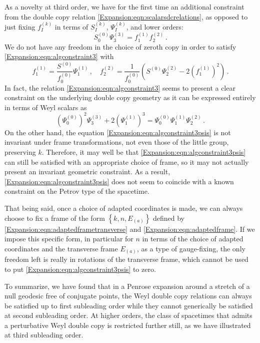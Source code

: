 As a novelty at third order, we have for the first time an additional constraint from the double copy relation \eqref{Expansion:eqn:scalarsdcrelations}, as opposed to just fixing $f^{(k)}_I$ in terms of $S^{(k)}_I$, $\Psi^{(k)}_I$, and lower orders:
\begin{equation}\label{Expansion:eqn:algconstraint3}
S^{(0)}_0 \Psi_3^{(3)} = f^{(1)}_1 f^{(2)}_2 \, .
\end{equation}
We do not have any freedom in the choice of zeroth copy in order to satisfy \eqref{Expansion:eqn:algconstraint3} with 
\begin{equation}
f^{(1)}_1 = \frac{S^{(0)}}{f_0^{(0)}} \Psi_1^{(1)}  \, , \quad  f^{(2)}_2 = \frac{1}{f_0^{(0)}}\left(S^{(0)}\Psi_2^{(2)}-2 (f_1^{(1)})^2\right) \, .
\end{equation}
In fact, the relation \eqref{Expansion:eqn:algconstraint3} seems to present a clear constraint on the underlying double copy geometry as it can be expressed entirely in terms of Weyl scalars as
\begin{equation}\label{Expansion:eqn:algconstraint3psis}
(\Psi_0^{(0)})^2 \Psi_3^{(3)} + 2 ( \Psi_1^{(1)})^3=   \Psi_0^{(0)} \Psi_1^{(1)} \Psi_2^{(2)}\, .
\end{equation}
On the other hand, the equation \eqref{Expansion:eqn:algconstraint3psis} is not invariant under frame transformations, not even those of the little group, preserving $k$. Therefore, it may well be that \eqref{Expansion:eqn:algconstraint3psis} can still be satisfied with an appropriate choice of frame, so it may not actually present an invariant geometric constraint. As a result, \eqref{Expansion:eqn:algconstraint3psis} does not seem to coincide with a known constraint on the Petrov type of the spacetime.

That being said, once a choice of adapted coordinates is made, we can always choose to fix a frame of the form $\left\lbrace k, n,  E_{(a)} \right\rbrace$ defined by \eqref{Expansion:eqn:adaptedframetransverse} and \eqref{Expansion:eqn:adaptedframe}. If we impose this specific form, in particular for $n$ in terms of the choice of adapted coordinates and the transverse frame $E_{(a)}$, as a type of gauge-fixing, the only freedom left is really in rotations of the transverse frame, which cannot be used to put \eqref{Expansion:eqn:algconstraint3psis} to zero. 

To summarize, we have found that in a Penrose expansion around a stretch of a null geodesic free of conjugate points, the Weyl double copy relations can always be satisfied up to first subleading order while they cannot generically be satisfied at second subleading order. At higher orders, the class of spacetimes that admits a perturbative Weyl double copy is restricted further still, as we have illustrated at third subleading order. 

